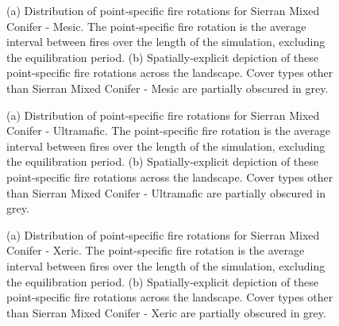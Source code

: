 \begin{figure}[!htbp]
  \centering
  \caption{(a) Distribution of point-specific fire rotations for Sierran Mixed Conifer - Mesic. The point-specific fire rotation is the average interval between fires over the length of the simulation, excluding the equilibration period. (b) Spatially-explicit depiction of these point-specific fire rotations across the landscape. Cover types other than Sierran Mixed Conifer - Mesic are partially obscured in grey.}
\label{fig:preturn_smcm_app}
\end{figure}

\begin{figure}[!htbp]
  \centering
  \caption{(a) Distribution of point-specific fire rotations for Sierran Mixed Conifer - Ultramafic. The point-specific fire rotation is the average interval between fires over the length of the simulation, excluding the equilibration period. (b) Spatially-explicit depiction of these point-specific fire rotations across the landscape. Cover types other than Sierran Mixed Conifer - Ultramafic are partially obscured in grey.}
\label{fig:preturn_smcu}
\end{figure}

\begin{figure}[!htbp]
  \centering
  \caption{(a) Distribution of point-specific fire rotations for Sierran Mixed Conifer - Xeric. The point-specific fire rotation is the average interval between fires over the length of the simulation, excluding the equilibration period. (b) Spatially-explicit depiction of these point-specific fire rotations across the landscape. Cover types other than Sierran Mixed Conifer - Xeric are partially obscured in grey.}
\label{fig:preturn_smcx_app}
\end{figure}

